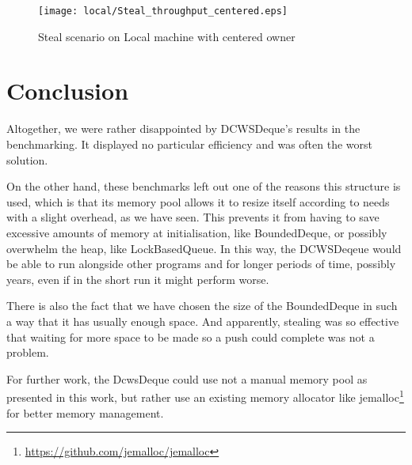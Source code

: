 \documentclass [10pt]{scrartcl}
\begin{document}
   
   \begin{figure}
      \centering
      \texttt{[image: local/Steal\_throughput\_centered.eps]}
      \caption{Steal scenario on Local machine with centered owner}
      \label{fig:steal_local_centered}
   \end{figure}
   
   \pagebreak
   \section{Conclusion}
   
   Altogether, we were rather disappointed by DCWSDeque's results in the benchmarking. It displayed no particular efficiency and was often the worst solution.
   
   On the other hand, these benchmarks left out one of the reasons this structure is used, which is that its memory pool allows it to resize itself according to needs with a slight overhead, as we have seen. This prevents it from having to save excessive amounts of memory at initialisation, like BoundedDeque, or possibly overwhelm the heap, like LockBasedQueue. In this way, the DCWSDeqeue would be able to run alongside other programs and for longer periods of time, possibly years, even if in the short run it might perform worse.
   
   There is also the fact that we have chosen the size of the BoundedDeque in such a way that it has usually enough space. And apparently, stealing was so effective that waiting for more space to be made so a push could complete was not a problem.
   
   For further work, the DcwsDeque could use not a manual memory pool as presented in this work, but rather use an existing memory allocator like jemalloc\footnote{\url{https://github.com/jemalloc/jemalloc}} for better memory management.
   
   
   
   
   
   
   
   
   
   
   
   
   
   
   \clearpage
   
   
   
\end{document}
